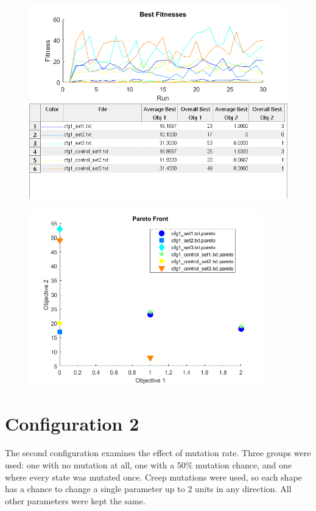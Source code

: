 \documentclass[11pt]{article}
\begin{document}
\begin{figure}[H]
	\centering
  \includegraphics[width=5in]{assn1d_cfg1_bestfitness.png}
  \label{fig:cfg1_best}
\end{figure}

\begin{figure}[H]
	\centering
  \includegraphics[width=4in]{assn1d_cfg1_pareto.png}
  \label{fig:cfg1_pareto}
\end{figure}

\section{Configuration 2}\label{sect:cfg2}

The second configuration examines the effect of mutation rate. Three groups were used: one with no mutation at all, one with a 50\% mutation chance, and one where every state was mutated once. Creep mutations were used, so each shape has a chance to change a single parameter up to 2 units in any direction. All other parameters were kept the same.
\end{document}
